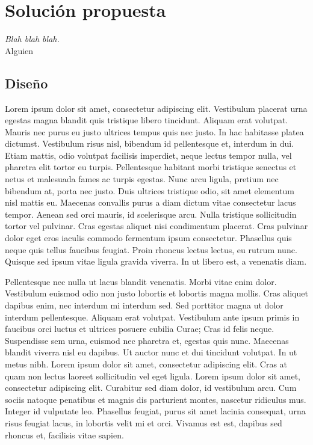 
\chapter*{Soluci\'on propuesta} \label{cap3}


\begin{flushright}
\begin{minipage}{7.85cm}
    {\em Blah blah blah.} \\  Alguien
\end{minipage}
\end{flushright}

\vspace*{5mm}

\section*{Diseño}

Lorem ipsum dolor sit amet, consectetur adipiscing elit. Vestibulum placerat
urna egestas magna blandit quis tristique libero tincidunt. Aliquam erat
volutpat. Mauris nec purus eu justo ultrices tempus quis nec justo. In hac
habitasse platea dictumst. Vestibulum risus nisl, bibendum id pellentesque et,
interdum in dui. Etiam mattis, odio volutpat facilisis imperdiet, neque lectus
tempor nulla, vel pharetra elit tortor eu turpis. Pellentesque habitant morbi
tristique senectus et netus et malesuada fames ac turpis egestas. Nunc arcu
ligula, pretium nec bibendum at, porta nec justo. Duis ultrices tristique odio,
sit amet elementum nisl mattis eu. Maecenas convallis purus a diam dictum vitae
consectetur lacus tempor. Aenean sed orci mauris, id scelerisque arcu. Nulla
tristique sollicitudin tortor vel pulvinar. Cras egestas aliquet nisi
condimentum placerat. Cras pulvinar dolor eget eros iaculis commodo fermentum
ipsum consectetur. Phasellus quis neque quis tellus faucibus feugiat. Proin
rhoncus lectus lectus, eu rutrum nunc. Quisque sed ipsum vitae ligula gravida
viverra. In ut libero est, a venenatis diam.

Pellentesque nec nulla ut lacus blandit venenatis. Morbi vitae enim dolor.
Vestibulum euismod odio non justo lobortis et lobortis magna mollis. Cras
aliquet dapibus enim, nec interdum mi interdum sed. Sed porttitor magna ut dolor
interdum pellentesque. Aliquam erat volutpat. Vestibulum ante ipsum primis in
faucibus orci luctus et ultrices posuere cubilia Curae; Cras id felis neque.
Suspendisse sem urna, euismod nec pharetra et, egestas quis nunc. Maecenas
blandit viverra nisl eu dapibus. Ut auctor nunc et dui tincidunt volutpat. In ut
metus nibh. Lorem ipsum dolor sit amet, consectetur adipiscing elit. Cras at
quam non lectus laoreet sollicitudin vel eget ligula. Lorem ipsum dolor sit
amet, consectetur adipiscing elit. Curabitur sed diam dolor, id vestibulum arcu.
Cum sociis natoque penatibus et magnis dis parturient montes, nascetur ridiculus
mus. Integer id vulputate leo. Phasellus feugiat, purus sit amet lacinia
consequat, urna risus feugiat lacus, in lobortis velit mi et orci. Vivamus est
est, dapibus sed rhoncus et, facilisis vitae sapien.

